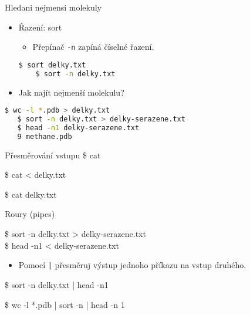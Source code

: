 \documentclass{beamer}
\begin{document}
\begin{frame}[fragile]{Hledani nejmensi molekuly}
	\begin{itemize}
	\item Řazení: sort
		\begin{itemize}
			\item Přepínač \texttt{-n} zapíná číselné řazení.
		\end{itemize}
	\begin{lstlisting}[language=bash]
	$ sort delky.txt
	$ sort -n delky.txt
	\end{lstlisting}

\item Jak najít nejmenší molekulu?
		\end{itemize}
	\begin{lstlisting}[language=bash]
   $ wc -l *.pdb > delky.txt
   $ sort -n delky.txt > delky-serazene.txt
   $ head -n1 delky-serazene.txt
   9 methane.pdb
	\end{lstlisting}
\end{frame}

\begin{frame}[fragile]{Přesměrování vstupu}
	\$ cat
	\begin{center}
	
	\end{center}	

	\$ cat < delky.txt	
	\begin{center}
	
	\end{center}	
	
	\$ cat delky.txt	
	\begin{center}
		
	\end{center}	
\end{frame}

\begin{frame}[fragile]{Roury (pipes)}
	
	\hspace{1em} \$ sort -n delky.txt > delky-serazene.txt	 \\
	\hspace{1em} \$ head -n1 < delky-serazene.txt
		\begin{center}
		
	\end{center}
	\begin{itemize}
		\item Pomocí \texttt{|} přesměruj výstup jednoho příkazu na vstup druhého.
	\end{itemize}
	\hspace{2em} \$ sort -n delky.txt | head -n1
	\begin{center}
		
	\end{center}

	\hspace{2em} \$ wc -l *.pdb | sort -n | head -n 1
	\begin{center}
	
	\end{center}	
\end{frame}
\end{document}
